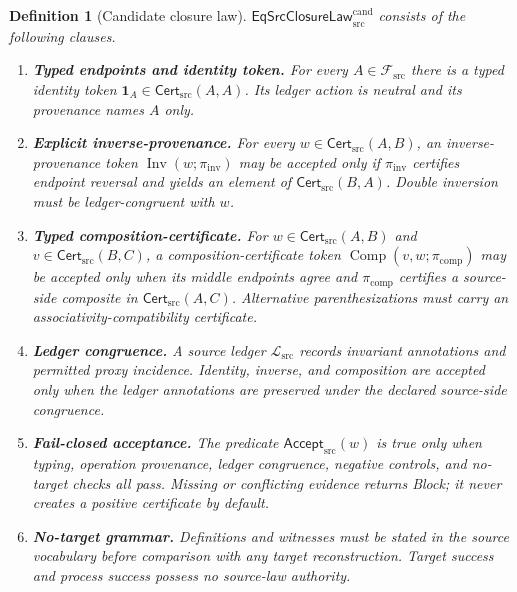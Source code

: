 \documentclass[11pt]{article}
\newtheorem{definition}{Definition}
\begin{document}
\begin{definition}[Candidate closure law]
$\mathsf{EqSrcClosureLaw}^{\mathrm{cand}}_{\mathrm{src}}$ consists of the
following clauses.

\begin{enumerate}
\item \textbf{Typed endpoints and identity token.} For every
$A\in\mathcal F_{\mathrm{src}}$ there is a typed identity token
$\mathbf 1_A\in\mathsf{Cert}_{\mathrm{src}}(A,A)$. Its ledger action is
neutral and its provenance names $A$ only.

\item \textbf{Explicit inverse-provenance.} For every
$w\in\mathsf{Cert}_{\mathrm{src}}(A,B)$, an inverse-provenance token
$\operatorname{Inv}(w;\pi_{\mathrm{inv}})$ may be accepted only if
$\pi_{\mathrm{inv}}$ certifies endpoint reversal and yields an element of
$\mathsf{Cert}_{\mathrm{src}}(B,A)$. Double inversion must be ledger-congruent
with $w$.

\item \textbf{Typed composition-certificate.} For
$w\in\mathsf{Cert}_{\mathrm{src}}(A,B)$ and
$v\in\mathsf{Cert}_{\mathrm{src}}(B,C)$, a composition-certificate token
$\operatorname{Comp}(v,w;\pi_{\mathrm{comp}})$ may be accepted only when its
middle endpoints agree and $\pi_{\mathrm{comp}}$ certifies a source-side
composite in $\mathsf{Cert}_{\mathrm{src}}(A,C)$. Alternative parenthesizations
must carry an associativity-compatibility certificate.

\item \textbf{Ledger congruence.} A source ledger
$\mathcal L_{\mathrm{src}}$ records invariant annotations and permitted proxy
incidence. Identity, inverse, and composition are accepted only when the ledger
annotations are preserved under the declared source-side congruence.

\item \textbf{Fail-closed acceptance.} The predicate
$\mathsf{Accept}_{\mathrm{src}}(w)$ is true only when typing, operation
provenance, ledger congruence, negative controls, and no-target checks all pass.
Missing or conflicting evidence returns \textsf{Block}; it never creates a
positive certificate by default.

\item \textbf{No-target grammar.} Definitions and witnesses must be stated in
the source vocabulary before comparison with any target reconstruction. Target
success and process success possess no source-law authority.
\end{enumerate}
\end{definition}
\end{document}
